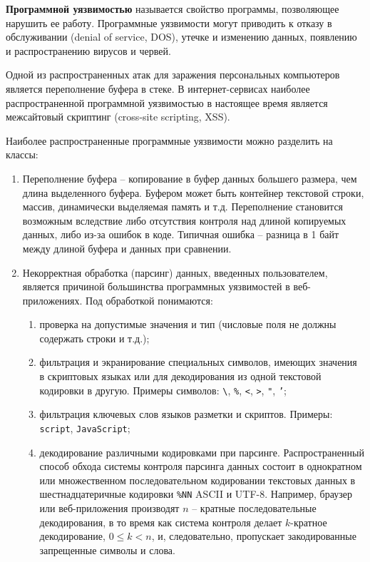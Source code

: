 \documentclass[10pt,a4paper]{book}
\begin{document}
\textbf{Программной уязвимостью} называется свойство программы, позволяющее нарушить ее работу. Программные уязвимости могут приводить к отказу в обслуживании (denial of service, DOS), утечке и изменению данных, появлению и распространению вирусов и червей.

Одной из распространенных атак для заражения персональных компьютеров является переполнение буфера в стеке. В интернет-сервисах наиболее распространенной программной уязвимостью в настоящее время является межсайтовый скриптинг (cross-site scripting, XSS).

Наиболее распространенные программные уязвимости можно разделить на классы:
\begin{enumerate}
    \item Переполнение буфера -- копирование в буфер данных большего размера, чем длина выделенного буфера. Буфером может быть контейнер текстовой строки, массив, динамически выделяемая память и т.д. Переполнение становится возможным вследствие либо отсутствия контроля над длиной копируемых данных, либо из-за ошибок в коде. Типичная ошибка -- разница в 1 байт между длиной буфера и данных при сравнении.
    \item Некорректная обработка (парсинг) данных, введенных пользователем, является причиной большинства программных уязвимостей в веб-приложениях. Под обработкой понимаются:
        \begin{enumerate}
            \item проверка на допустимые значения и тип (числовые поля не должны содержать строки и т.д.);
            \item фильтрация и экранирование специальных символов, имеющих значения в скриптовых языках или для декодирования из одной текстовой кодировки в другую. Примеры символов: \texttt{\textbackslash},  \texttt{\%}, \texttt{<}, \texttt{>}, \texttt{"},  \texttt{'};
            \item фильтрация ключевых слов языков разметки и скриптов. Примеры: \texttt{script}, \texttt{JavaScript};
            \item декодирование различными кодировками при парсинге. Распространенный способ обхода системы контроля парсинга данных состоит в однократном или множественном последовательном кодировании текстовых данных в шестнадцатеричные кодировки \texttt{\%NN} ASCII и UTF-8. Например, браузер или веб-приложения производят $n$ -- кратные последовательные декодирования, в то время как система контроля делает $k$-кратное декодирование, $0 \leq k < n$, и, следовательно, пропускает закодированные запрещенные символы и слова.

\end{enumerate}
\end{enumerate}
\end{document}
